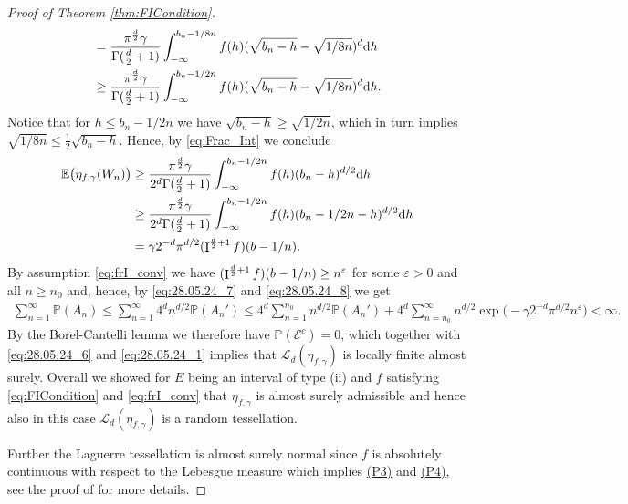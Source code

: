\documentclass[11pt,a4paper]{article}
\theoremstyle{plain}
\theoremstyle{definition}
\theoremstyle{remark}
\def\EE{\mathbb{E}}
\def\PP{\mathbb{P}}
\def\cL{\mathcal{L}}
\newcommand{\dd}{{\rm d}}
\newcommand{\frI}{\mathop{\mathrm{I}}\nolimits}
\begin{document}
\begin{proof}[Proof of Theorem \ref{thm:FICondition}]
\begin{align*}
        &= \frac{\pi^{\frac{d}{2}}\gamma}{\Gamma({\frac{d}{2}}+1)}\int_{-\infty}^{b_n-1/8n} f(h) (\sqrt{b_n-h}-\sqrt{1/8n})^d \dd h\\
        &\ge \frac{\pi^{\frac{d}{2}}\gamma}{\Gamma({\frac{d}{2}}+1)} \int_{-\infty}^{b_n-1/2n} f(h) (\sqrt{b_n-h}-\sqrt{1/8n})^d \dd h.
    \end{align*}
    Notice that for $h\leq b_n-1/2n$ we have $\sqrt{b_n-h}\ge\sqrt{1/2n}$, which in turn implies $\sqrt{1/8n} \le \frac{1}{2} \sqrt{b_n-h}$. Hence, by \eqref{eq:Frac_Int} we conclude
    \begin{align*}
        \EE\big(\eta_{f,\gamma}(W_{n})\big) &\ge \frac{\pi^{\frac{d}{2}}\gamma}{2^d\Gamma({\frac{d}{2}}+1)}\int_{-\infty}^{b_n-1/2n} f(h) (b_n-h)^{d/2} \dd h\\
        &\ge \frac{\pi^{\frac{d}{2}}\gamma}{2^d\Gamma({\frac{d}{2}}+1)} \int_{-\infty}^{b_n-1/2n} f(h) (b_n-1/2n-h)^{d/2} \dd h\\
        &= \gamma 2^{-d}\pi^{d/2} (\frI^{{d\over 2}+1}f)(b-1/n).
    \end{align*}
    By assumption \eqref{eq:frI_conv} we have $(\frI^{{d\over 2}+1}f)(b-1/n)\ge n^\varepsilon$ for some $\varepsilon >0$ and all $n \ge n_0$ and, hence, by \eqref{eq:28.05.24_7} and \eqref{eq:28.05.24_8} we get
    \begin{align*}
        \sum_{n=1}^\infty \PP(A_n) \le \sum_{n=1}^\infty 4^d n^{d/2} \PP(A_n') \le 4^d \sum_{n=1}^{n_0} n^{d/2} \PP(A_n')+4^d\sum_{n=n_0}^\infty n^{d/2} \exp\big( - \gamma 2^{-d}\pi^{d/2} n^\varepsilon\big) < \infty.
    \end{align*}
    By the Borel-Cantelli lemma we therefore have $\PP(\mathcal{E}^c)=0$, which together with \eqref{eq:28.05.24_6} and \eqref{eq:28.05.24_1} implies that $\cL_d(\eta_{f,\gamma})$ is locally finite almost surely. Overall we showed for $E$ being an interval of type (ii) and $f$ satisfying \eqref{eq:FICondition} and \eqref{eq:frI_conv} that $\eta_{f,\gamma}$ is almost surely admissible and hence also in this case $\cL_d(\eta_{f,\gamma})$ is a random tessellation.
    
    Further the Laguerre tessellation is almost surely normal since $f$ is absolutely continuous with respect to the Lebesgue measure which implies \hyperref[item:P3]{(P3)} and \hyperref[item:P4]{(P4)}, see the proof of \cite[Lemma 3]{GKT20} for more details.
\end{proof}
\end{document}
